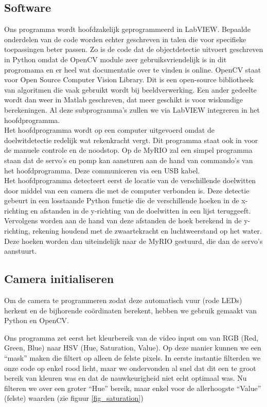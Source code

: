 \documentclass{kulakarticle}
\begin{document}
\subsection{Software}
Ons programma wordt hoofdzakelijk geprogrammeerd in LabVIEW. Bepaalde onderdelen van de code worden echter geschreven in talen die voor specifieke toepassingen beter passen. Zo is de code  dat de objectdetectie uitvoert geschreven in Python omdat de OpenCV module zeer gebruiksvriendelijk is in dit progromama en er heel wat documentatie over te vinden is online. OpenCV staat voor Open Source Computer Vision Library. Dit is een open-source bibliotheek van algoritmen die vaak gebruikt wordt bij beeldverwerking. Een ander gedeelte wordt dan weer in Matlab geschreven, dat meer geschikt is voor wiskundige berekeningen. Al deze subprogramma's zullen we via LabVIEW integreren in het hoofdprogramma.\\
Het hoofdprogramma wordt op een computer uitgevoerd omdat de doelwitdetectie redelijk wat rekenkracht vergt. Dit programma staat ook in voor de manuele controle en de noodstop. Op de MyRIO zal een simpel programma staan dat de servo's en pomp kan aansturen aan de hand van commando's van het hoofdprogramma. Deze communiceren via een USB kabel. \\
Het hoofdprogramma detecteert eerst de locatie van de verschillende doelwitten door middel van een camera die met de computer verbonden is. Deze detectie gebeurt in een losstaande Python functie die de verschillende hoeken in de x-richting en afstanden in de y-richting van de doelwitten in een lijst teruggeeft. Vervolgens worden aan de hand van deze afstanden de hoek berekend in de y-richting, rekening houdend met de zwaartekracht en luchtweerstand op het water. Deze hoeken worden dan uiteindelijk naar de MyRIO gestuurd, die dan de servo's aanstuurt.

\subsection{Camera initialiseren}
Om de camera te programmeren zodat deze automatisch vuur (rode LEDs) herkent en de bijhorende coördinaten berekent, hebben we gebruik gemaakt van Python en OpenCV. 

Ons programma zet eerst het kleurbereik van de video input om van RGB (Red, Green, Blue) naar HSV (Hue, Saturation, Value). Op deze manier kunnen we een “mask” maken die filtert op alleen de felste pixels. In eerste instantie filterden we onze code op enkel rood licht, maar we ondervonden al snel dat dit een te groot bereik van kleuren was en dat de nauwkeurigheid niet echt optimaal was. Nu filteren we over een groter “Hue” bereik, maar enkel voor de allerhoogste “Value” (felste) waarden (zie figuur \ref{fig_saturation}) 
\end{document}
